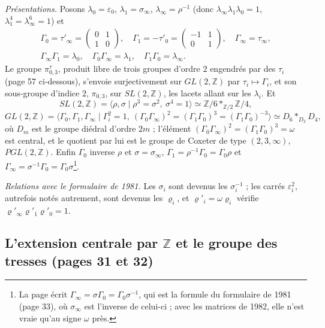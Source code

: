 \documentclass[11pt,a4paper]{article}
\begin{document}
\emph{Présentations.} Posons $\lambda_0 = \varepsilon_0$, $\lambda_1 = \sigma_\infty$,
$\lambda_\infty = \rho^{-1}$ (donc $\lambda_\infty\lambda_1\lambda_0 = 1$,
$\lambda_1^4 = \lambda_\infty^6 = 1$) et
\[
\begin{gathered}
\Gamma_0 = \tau'_\infty = \begin{pmatrix} 0 & 1 \\ 1 & 0 \end{pmatrix}, \quad
\Gamma_1 = -\tau'_0 = \begin{pmatrix} -1 & 1 \\ 0 & 1 \end{pmatrix}, \quad
\Gamma_\infty = \tau_\infty, \\
\Gamma_\infty\Gamma_1 = \lambda_0, \quad \Gamma_0\Gamma_\infty = \lambda_1, \quad \Gamma_1\Gamma_0 = \lambda_\infty .
\end{gathered}
\]
Le groupe $\pi^{\tau}_{0,3}$, produit libre de trois groupes d'ordre $2$
engendrés par des $\tau_i$ (page 57 ci-dessous), s'envoie surjectivement sur
$GL(2, \mathbb{Z})$ par $\tau_i \mapsto \Gamma_i$, et son sous-groupe
d'indice $2$, $\pi_{0,3}$, sur $SL(2, \mathbb{Z})$, les lacets allant sur les
$\lambda_i$. Et
\[
SL(2, \mathbb{Z}) = \langle \rho, \sigma \mid \rho^3 = \sigma^2,\ \sigma^4 = 1 \rangle \simeq \mathbb{Z}/6 *_{\mathbb{Z}/2} \mathbb{Z}/4,
\]
\[
GL(2, \mathbb{Z}) = \langle \Gamma_0, \Gamma_1, \Gamma_\infty \mid
\Gamma_i^2 = 1,\ (\Gamma_0\Gamma_\infty)^2 = (\Gamma_1\Gamma_0)^3 = (\Gamma_1\Gamma_0)^{-3} \rangle
\simeq D_6 *_{D_2} D_4 ,
\]
où $D_m$ est le groupe diédral d'ordre $2m$ ; l'élément
$(\Gamma_0\Gamma_\infty)^2 = (\Gamma_1\Gamma_0)^3 = \omega$ est central, et le
quotient par lui est le groupe de Coxeter de type $(2, 3, \infty)$,
$PGL(2, \mathbb{Z})$. Enfin $\Gamma_0$ inverse $\rho$ et $\sigma = \sigma_\infty$,
$\Gamma_1 = \rho^{-1}\Gamma_0 = \Gamma_0\rho$ et
$\Gamma_\infty = \sigma^{-1}\Gamma_0 = \Gamma_0\sigma$\footnote{La page écrit
$\Gamma_\infty = \sigma\Gamma_0 = \Gamma_0\sigma^{-1}$, qui est la formule du
formulaire de 1981 (page 33), où $\sigma_\infty$ est l'inverse de celui-ci ;
avec les matrices de 1982, elle n'est vraie qu'au signe $\omega$ près.}.

\emph{Relations avec le formulaire de 1981.} Les $\sigma_i$ sont devenus les
$\sigma_i^{-1}$ ; les carrés $\varepsilon_i^2$, autrefois notés autrement, sont
devenus les $\varrho_i$, et $\varrho'_i = \omega\varrho_i$ vérifie
$\varrho'_\infty\varrho'_1\varrho'_0 = 1$.

\subsection*{L'extension centrale par $\mathbb{Z}$ et le groupe des tresses (pages 31 et 32)}
\end{document}
